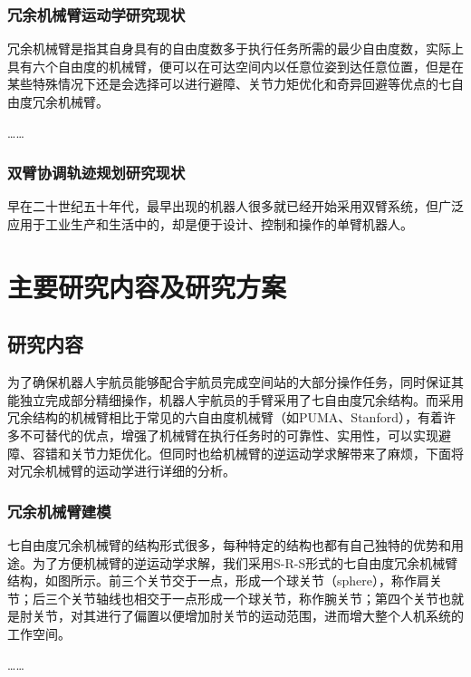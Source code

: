 \subsubsection{冗余机械臂运动学研究现状}

冗余机械臂是指其自身具有的自由度数多于执行任务所需的最少自由度数，实际上具有六个自由度的机械臂，便可以在可达空间内以任意位姿到达任意位置，但是在某些特殊情况下还是会选择可以进行避障、关节力矩优化和奇异回避等优点的七自由度冗余机械臂。

……

\hitenter

\subsubsection{双臂协调轨迹规划研究现状}

早在二十世纪五十年代，最早出现的机器人很多就已经开始采用双臂系统，但广泛应用于工业生产和生活中的，却是便于设计、控制和操作的单臂机器人。

\section{主要研究内容及研究方案}

\subsection{研究内容}

为了确保机器人宇航员能够配合宇航员完成空间站的大部分操作任务，同时保证其能独立完成部分精细操作，机器人宇航员的手臂采用了七自由度冗余结构。而采用冗余结构的机械臂相比于常见的六自由度机械臂（如PUMA、Stanford），有着许多不可替代的优点，增强了机械臂在执行任务时的可靠性、实用性，可以实现避障、容错和关节力矩优化。但同时也给机械臂的逆运动学求解带来了麻烦，下面将对冗余机械臂的运动学进行详细的分析。

\subsubsection{冗余机械臂建模}

七自由度冗余机械臂的结构形式很多，每种特定的结构也都有自己独特的优势和用途。为了方便机械臂的逆运动学求解，我们采用S-R-S形式的七自由度冗余机械臂结构，如图所示。前三个关节交于一点，形成一个球关节（sphere），称作肩关节；后三个关节轴线也相交于一点形成一个球关节，称作腕关节；第四个关节也就是肘关节，对其进行了偏置以便增加肘关节的运动范围，进而增大整个人机系统的工作空间。

……

